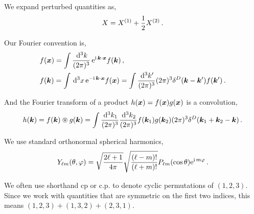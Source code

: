 We expand perturbed quantities as,
\begin{equation*}
	X = X^{(1)} + \frac{1}{2} X^{(2)}\,.
\end{equation*}

Our Fourier convention is, 
\begin{align*}
	&f(\bm {x}) = \int \frac{\,\mathrm{d}^3 k}{(2\pi)^3}\, \mathrm{e}^{\mathrm{i\,} \bm {k} \cdot \bm {x}} f(\bm {k})\,,\\
	&f(\bm {k}) = \int \,\mathrm{d}^3x\, \mathrm{e}^{- \mathrm{i\,} \bm {k}\cdot\bm {x}} f(\bm {x}) = \int \frac{\,\mathrm{d}^3 k'}{(2\pi)^3} (2\pi)^3 \delta^D(\bm {k}-\bm {k}') f(\bm {k}')\,.
\end{align*}

And the Fourier transform of a product $h (\bm {x}) = f(\bm {x}) g(\bm {x})$ is a convolution, 
\begin{equation*}
	h(\bm {k}) = f(\bm {k}) \circledast g(\bm {k}) = \int \frac{\,\mathrm{d}^3k_1}{(2\pi)^3} \frac{\,\mathrm{d}^3k_2}{(2\pi)^3} f(\bm {k}_1) g(\bm {k}_2) (2\pi)^3 \delta^D(\bm {k}_1 +\bm {k}_2 - \bm {k})\,.
\end{equation*}

We use standard orthonormal spherical harmonics,
\begin{equation*}
	Y_{\ell m}(\theta,\varphi) = \sqrt{\frac{2 \ell + 1}{4 \pi}} \sqrt{\frac{(\ell - m)!}{(\ell + m)!}} P_{\ell m}(\cos \theta) \mathrm{e}^{\mathrm{i\,} m \varphi}\,.
\end{equation*}

We often use shorthand cp or c.p. to denote cyclic permutations of $(1,2,3)$. Since we work with quantities that are symmetric on the first two indices, this means $(1,2,3) + (1,3,2) + (2,3,1)$.






